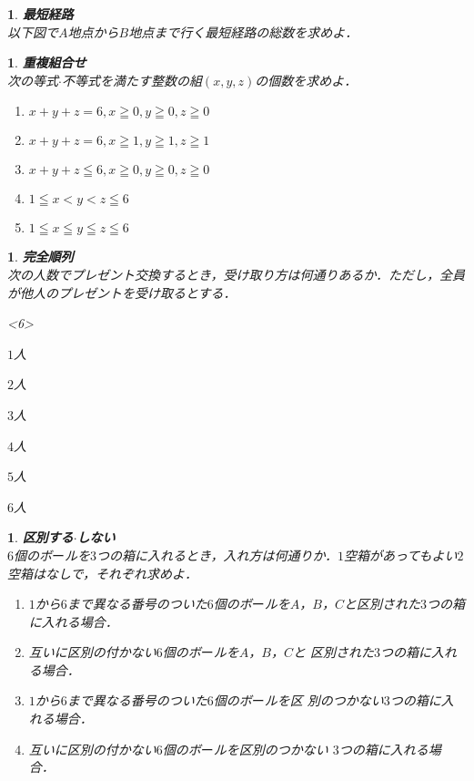 \documentclass[10pt,
fleqn,
dvipdfmx,
uplatex
]{jsarticle}
\newtheorem{question}[Question]{}
\begin{document}
\begin{question}{\bf\boldmath 最短経路}\\
以下図で$A$地点から$B$地点まで行く最短経路の総数を求めよ．
\end{question}



\begin{question}{\bf\boldmath 重複組合せ}\\
次の等式$\cdot$不等式を満たす整数の組$\left(x, y, z\right)$の個数を求めよ．
\begin{enumerate}
\item $x+y+z=6, x\geqq 0, y\geqq 0, z\geqq 0$
\item $x+y+z=6, x\geqq 1, y\geqq 1, z\geqq 1$
\item $x+y+z\leqq 6, x\geqq 0, y\geqq 0, z\geqq 0$
\item $1\leqq x<y<z\leqq 6$
\item $1\leqq x\leqq y\leqq z\leqq 6$
\end{enumerate}

\end{question}



\begin{question}{\bf\boldmath 完全順列}\\
次の人数でプレゼント交換するとき，受け取り方は何通りあるか．ただし，全員が他人のプレゼントを受け取るとする．
\begin{edaenumerate}<6>
\item $1$人
\item $2$人
\item $3$人
\item $4$人
\item $5$人
\item $6$人
\end{edaenumerate}

\end{question}



\begin{question}{\bf\boldmath 区別する$\cdot$しない}\\
$6$個のボ$ー$ルを$3$つの箱に入れるとき，入れ方は何通りか．$1$空箱があってもよい$2$空箱はなしで，それぞれ求めよ．
\begin{enumerate}
\item $1$から$6$まで異なる番号のついた$6$個のボ$ー$ルを$A$，$B$，$C$と区別された$3$つの箱に入れる場合．
\item 互いに区別の付かない$6$個のボ$ー$ルを$A$，$B$，$C$と
区別された$3$つの箱に入れる場合．
\item $1$から$6$まで異なる番号のついた$6$個のボ$ー$ルを区
別のつかない$3$つの箱に入れる場合．
\item 互いに区別の付かない$6$個のボ$ー$ルを区別のつかない
$3$つの箱に入れる場合．
\end{enumerate}

\end{question}
\end{document}
